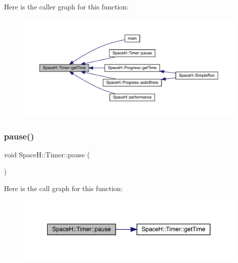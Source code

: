 Here is the caller graph for this function\+:
\nopagebreak
\begin{figure}[H]
\begin{center}
\leavevmode
\includegraphics[width=350pt]{class_space_h_1_1_timer_a65e860a9cfce03262f641aab780c4555_icgraph}
\end{center}
\end{figure}
\mbox{\label{class_space_h_1_1_timer_a5bcada7781d8fc8f858607d81d9730bd}} 
\subsubsection{\texorpdfstring{pause()}{pause()}}
{\footnotesize\ttfamily void Space\+H\+::\+Timer\+::pause (\begin{DoxyParamCaption}{ }\end{DoxyParamCaption})\hspace{0.3cm}{\ttfamily [inline]}}

Here is the call graph for this function\+:
\nopagebreak
\begin{figure}[H]
\begin{center}
\leavevmode
\includegraphics[width=350pt]{class_space_h_1_1_timer_a5bcada7781d8fc8f858607d81d9730bd_cgraph}
\end{center}
\end{figure}
\mbox{\label{class_space_h_1_1_timer_a80e119ed1c08d10f36b725cfb85fd8c1}} 
